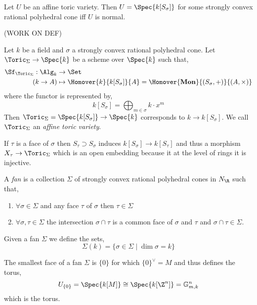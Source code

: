 \documentclass[12pt]{article}
\begin{document}
\begin{theorem}
Let $U$ be an affine toric variety. Then $U = \Spec{k[S_\sigma]}$ for some strongly convex rational polyhedral cone iff $U$ is normal. 
\end{theorem}

(WORK ON DEF)

\begin{definition}
Let $k$ be a field and $\sigma$ a strongly convex rational polyhedral cone. Let $\Toric_\Sigma \to \Spec{k}$ be a scheme over $\Spec{k}$ such that,
\begin{align*}
\Sf_{\Toric_\Sigma} : \Alg_k & \to \Set
\\
(k \to A) & \mapsto \Homover{k}{k[S_\sigma]}{A} = \Homover{\mathbf{Mon}}{(S_\sigma, +)}{(A, \times)}
\end{align*}
where the functor is represented by,
\[ k[S_\sigma] = \bigoplus_{m \in \sigma} k \cdot x^m \]
Then $\Toric_\Sigma = \Spec{k[S_\sigma]} \to \Spec{k}$ corresponds to $k \to k[S_\sigma]$. 
We call $\Toric_\Sigma$ an \textit{affine toric variety}.
\end{definition}

\begin{remark}
If $\tau$ is a face of $\sigma$ then $S_\tau \supset S_\sigma$ induces $k[S_\sigma] \to k[S_\tau]$ and thus a morphism $X_\tau \to \Toric_\Sigma$ which is an open embedding because it at the level of rings it is injective. 
\end{remark}

\begin{definition}
A \textit{fan} is a collection $\Sigma$ of strongly convex rational polyhedral cones in $N_\R$ such that,
\begin{enumerate}
\item $\forall \sigma \in \Sigma$ and any face $\tau$ of $\sigma$ then $\tau \in \Sigma$

\item $\forall \sigma, \tau \in \Sigma$ the intersection $\sigma \cap \tau$ is a common face of $\sigma$ and $\tau$ and $\sigma \cap \tau \in \Sigma$.
\end{enumerate}
Given a fan $\Sigma$ we define the sets,
\[ \Sigma(k) = \{ \sigma \in \Sigma \mid \dim{\sigma} = k \} \]
\end{definition}

\begin{remark}
The smallest face of a fan $\Sigma$ is $\{ 0 \}$ for which $\{ 0 \}^\vee = M$ and thus defines the torus,
\[ U_{\{0\}} = \Spec{k[M]} \cong \Spec{k[\Z^n]} = \mathbb{G}_{m,k}^n \]
which is the torus. 
\end{remark}
\end{document}
